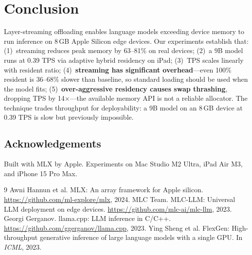 \documentclass[10pt,a4paper]{article}
\begin{document}
\section{Conclusion}

Layer-streaming offloading enables language models exceeding device memory to run inference on 8\,GB Apple Silicon edge devices. Our experiments establish that: (1)~streaming reduces peak memory by 63--81\% on real devices; (2)~a 9B model runs at 0.39 TPS via adaptive hybrid residency on iPad; (3)~TPS scales linearly with resident ratio; (4)~\textbf{streaming has significant overhead}---even 100\% resident is 36--68\% slower than baseline, so standard loading should be used when the model fits; (5)~\textbf{over-aggressive residency causes swap thrashing}, dropping TPS by 14$\times$---the available memory API is not a reliable allocator. The technique trades throughput for deployability: a 9B model on an 8\,GB device at 0.39 TPS is slow but previously impossible.

\subsection*{Acknowledgements}

Built with MLX by Apple. Experiments on Mac Studio M2 Ultra, iPad Air M3, and iPhone 15 Pro Max.

\begin{thebibliography}{9}
 Awni Hannun et al. MLX: An array framework for Apple silicon. \url{https://github.com/ml-explore/mlx}, 2024.
 MLC Team. MLC-LLM: Universal LLM deployment on edge devices. \url{https://github.com/mlc-ai/mlc-llm}, 2023.
 Georgi Gerganov. llama.cpp: LLM inference in C/C++. \url{https://github.com/ggerganov/llama.cpp}, 2023.
 Ying Sheng et al. FlexGen: High-throughput generative inference of large language models with a single GPU. In \textit{ICML}, 2023.
\end{thebibliography}
\end{document}

